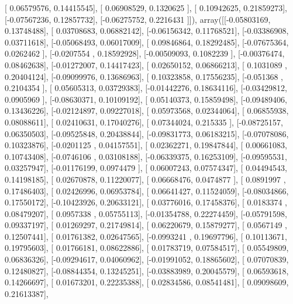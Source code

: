 \documentclass{article}
\begin{document}
       [ 0.06579576,  0.14415545],
       [ 0.06908529,  0.1320625 ],
       [ 0.10942625,  0.21859273],
       [-0.07567236,  0.12857732],
       [-0.06275752,  0.2216431 ]]), array([[-0.05803169,  0.13748488],
       [ 0.03708683,  0.06882142],
       [-0.06156342,  0.11768521],
       [-0.03386908,  0.03711618],
       [-0.05068493,  0.06017009],
       [ 0.09846864,  0.18292485],
       [-0.07675364,  0.0262462 ],
       [-0.0207554 ,  0.18592928],
       [-0.00509093,  0.1082239 ],
       [-0.00376474,  0.08462638],
       [-0.01272007,  0.14417423],
       [ 0.02650152,  0.06866213],
       [ 0.1031089 ,  0.20404124],
       [-0.09099976,  0.13686963],
       [ 0.10323858,  0.17556235],
       [-0.051368  ,  0.2104354 ],
       [ 0.05605313,  0.03729383],
       [-0.01442276,  0.18634116],
       [-0.03429812,  0.0905969 ],
       [-0.08630371,  0.10109192],
       [ 0.05140373,  0.15859498],
       [-0.09489406,  0.13436226],
       [-0.02124897,  0.09227018],
       [ 0.05973568,  0.02344064],
       [ 0.06855938,  0.08088611],
       [ 0.02410631,  0.17040276],
       [ 0.07344024,  0.215335  ],
       [-0.08725157,  0.06350503],
       [-0.09525848,  0.20438844],
       [-0.09831773,  0.06183215],
       [-0.07078086,  0.10323876],
       [-0.0201125 ,  0.04157551],
       [ 0.02362271,  0.19847844],
       [ 0.00661083,  0.10743408],
       [-0.0746106 ,  0.03108188],
       [-0.06339375,  0.16253109],
       [-0.09595531,  0.03257947],
       [-0.01176199,  0.0974479 ],
       [ 0.06007243,  0.07574347],
       [ 0.04494543,  0.14198185],
       [ 0.02670878,  0.11220077],
       [ 0.06668476,  0.0474877 ],
       [ 0.0891997 ,  0.17486403],
       [ 0.02426996,  0.06953784],
       [ 0.06641427,  0.11524059],
       [-0.08034866,  0.17550172],
       [-0.10423926,  0.20633121],
       [ 0.03776016,  0.17458376],
       [ 0.0183374 ,  0.08479207],
       [ 0.0957338 ,  0.05755113],
       [-0.01354788,  0.22274459],
       [-0.05791598,  0.09337197],
       [ 0.01269297,  0.21749814],
       [ 0.06220679,  0.15879277],
       [ 0.0567149 ,  0.12507441],
       [ 0.01761382,  0.02647565],
       [-0.0993241 ,  0.19697796],
       [ 0.10113671,  0.19795603],
       [ 0.01766181,  0.08622886],
       [ 0.01783719,  0.07584517],
       [ 0.05549809,  0.06836326],
       [-0.09294617,  0.04060962],
       [-0.01991052,  0.18865602],
       [ 0.07070839,  0.12480827],
       [-0.08844354,  0.13245251],
       [-0.03883989,  0.20045579],
       [ 0.06593618,  0.14266697],
       [ 0.01673201,  0.22235388],
       [ 0.02834586,  0.08541481],
       [ 0.09098609,  0.21613387],
\end{document}
